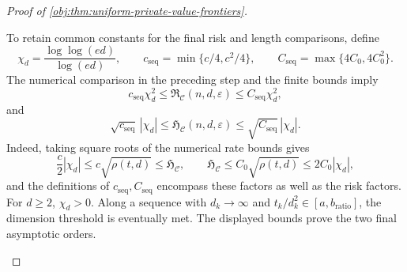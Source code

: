 \documentclass[11pt]{article}
\begin{document}
\begin{proof}[Proof of \cref{obj:thm:uniform-private-value-frontiers}]
\begin{enumerate}
To retain common constants for the final risk and length comparisons, define
\[
\chi_d=\frac{\log\log(ed)}{\log(ed)},\qquad
c_{\mathrm{seq}}=\min\{c/4,c^2/4\},\qquad
C_{\mathrm{seq}}=\max\{4C_0,4C_0^2\}.
\]
The numerical comparison in the preceding step and the finite bounds imply
\[
c_{\mathrm{seq}}\chi_d^2
\le\mathfrak R_{\mathcal C}(n,d,\varepsilon)
\le C_{\mathrm{seq}}\chi_d^2,
\]
and
\[
\sqrt{c_{\mathrm{seq}}}\,|\chi_d|
\le\mathfrak H_{\mathcal C}(n,d,\varepsilon)
\le\sqrt{C_{\mathrm{seq}}}\,|\chi_d|.
\]
Indeed, taking square roots of the numerical rate bounds gives
\[
\frac c2|\chi_d|
\le c\sqrt{\rho(t,d)}
\le\mathfrak H_{\mathcal C},
\qquad
\mathfrak H_{\mathcal C}
\le C_0\sqrt{\rho(t,d)}
\le2C_0|\chi_d|,
\]
and the definitions of \(c_{\mathrm{seq}},C_{\mathrm{seq}}\) encompass these factors as well as the risk factors.
For \(d\ge2\), \(\chi_d>0\).
Along a sequence with \(d_k\to\infty\) and
\(t_k/d_k^2\in[a,b_{\mathrm{ratio}}]\), the dimension threshold is eventually met.
The displayed bounds prove the two final asymptotic orders.
\end{enumerate}
\end{proof}
\end{document}
